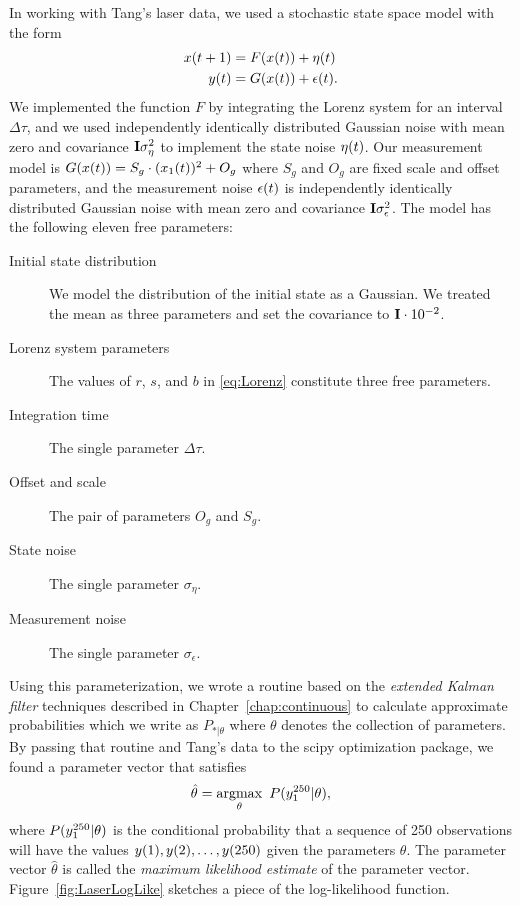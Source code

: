 In working with Tang's laser data, we used a stochastic state space
model with the form
\begin{subequations}
  \label{eq:FandG}
  \begin{align}
    {x}{(t+1)} &= F({x}{(t)}) + {\eta}{(t)}\\
    {y}{(t)}   &= G({x}{(t)}) + {\epsilon}{(t)}.
  \end{align}
\end{subequations}
We implemented the function $F$ by integrating the Lorenz system for
an interval $\Delta \tau$, and we used independently identically
distributed Gaussian noise with mean zero and covariance
${\bf I}\sigma_\eta^2$ to implement the state noise ${\eta}{(t)}$.
  Our measurement model is $G({x}{(t)}) = S_g \cdot
({x_1}{(t)})^2 + O_g$ where $S_g$ and $O_g$ are fixed scale and
offset parameters, and the measurement noise ${\epsilon}{(t)}$ is
independently identically distributed Gaussian noise with mean zero
and covariance ${\bf I}\sigma_\epsilon^2$.  The model has the following
eleven free parameters:
\begin{description}
\item[Initial state distribution] We model the distribution of the
  initial state as a Gaussian.  We treated the mean as three
  parameters and set the covariance to ${\bf I} \cdot 10^{-2}$.
\item[Lorenz system parameters] The values of $r$, $s$, and $b$ in
  \eqref{eq:Lorenz} constitute three free parameters.
\item[Integration time] The single parameter $\Delta \tau$.
\item[Offset and scale] The pair of parameters $O_g$ and $S_g$.
\item[State noise] The single parameter $\sigma_\eta$.
\item[Measurement noise] The single parameter $\sigma_\epsilon$.
\end{description}

Using this parameterization, we wrote a routine based on the
\emph{extended Kalman filter} %
%
%
techniques described in Chapter~\ref{chap:continuous} to calculate
approximate probabilities which we write as $P_{*|\theta}$ where
$\theta$ denotes the collection of parameters.  By passing that
routine and Tang's data to the scipy optimization package, we found a
parameter vector that satisfies
\begin{equation}
  \label{eq:theta-hat-laser}
  \hat \theta = \operatorname*{argmax}_{\theta} ~ P(y_{1}^{250}|\theta),
\end{equation}
where $P(y_{1}^{250}|\theta)$ is the conditional probability that a
sequence of 250 observations will have the values
${y}{(1)},{y}{(2)}, \ldots,{y}{(250)}$ given the parameters
$\theta$.  The parameter vector $\hat \theta$ is called the
\emph{maximum likelihood estimate} %
%
%
of the parameter vector.  Figure~\ref{fig:LaserLogLike} sketches a
piece of the log-likelihood function.

